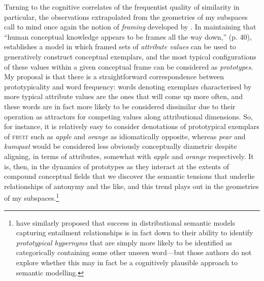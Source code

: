 Turning to the cognitive correlates of the frequentist quality of similarity in particular, the observations extrapolated from the geometries of my subspaces call to mind once again the notion of \emph{framing} developed by \cite{Barsalou1992}.  In maintaining that ``human conceptual knowledge appears to be frames all the way down,'' (p. 40), \citeauthor{Barsalou1992} establishes a model in which framed sets of \emph{attribute values} can be used to generatively construct conceptual exemplars, and the most typical configurations of these values within a given conceptual frame can be considered as \emph{prototypes}.  My proposal is that there is a straightforward correspondence between prototypicality and word frequency: words denoting exemplars characterised by more typical attribute values are the ones that will come up more often, and these words are in fact more likely to be considered dissimilar due to their operation as attractors for competing values along attributional dimensions.  So, for instance, it is relatively easy to consider denotations of prototypical exemplars of \textsc{fruit} such as \emph{apple} and \emph{orange} as idiomatically opposite, whereas \emph{pear} and \emph{kumquat} would be considered less obviously conceptually diametric despite aligning, in terms of attributes, somewhat with \emph{apple} and \emph{orange} respectively.  It is, then, in the dynamics of prototypes as they interact at the extents of compound conceptual fields that we discover the semantic tensions that underlie relationships of antonymy and the like, and this trend plays out in the geometries of my subspaces.\footnote{\cite{LevyEA2015} have similarly proposed that success in distributional semantic models capturing entailment relationships is in fact down to their ability to identify \emph{prototypical hypernyms} that are simply more likely to be identified as categorically containing some other unseen word---but those authors do not explore whether this may in fact be a cognitively plausible approach to semantic modelling.}


